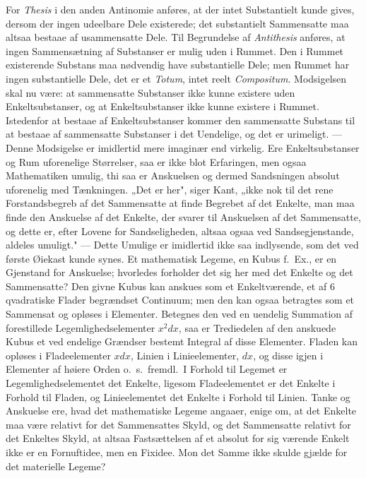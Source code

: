 \documentclass[12pt]{article}
\newcommand{\opage}[1]{\marginnote{\footnotesize\textit{[#1]}}}
\begin{document}
For \emph{Thesis} i den anden Antinomie anføres, at der intet
Substantielt kunde gives, dersom der ingen udeelbare Dele
existerede; det substantielt Sammensatte maa altsaa bestaae af
usammensatte Dele. Til Begrundelse af \emph{Antithesis} anføres, at
ingen Sammensætning af Substanser er mulig uden i Rummet.
Den i Rummet existerende Substans maa nødvendig have
substantielle Dele; men Rummet har ingen substantielle Dele, det
er et \emph{Totum}, intet reelt \emph{Compositum}. Modsigelsen skal nu
være: at sammensatte Substanser ikke kunne existere uden
Enkeltsubstanser, og at Enkeltsubstanser ikke kunne existere i
Rummet. Istedenfor at bestaae af Enkeltsubstanser kommer
den sammensatte Substans til at bestaae af sammensatte
Substanser i det Uendelige, og det er urimeligt. --- Denne
Modsigelse er imidlertid mere imaginær end virkelig. Ere Enkelt\-substanser
og Rum uforenelige Størrelser, saa er ikke blot
Erfaringen, men ogsaa Mathematiken umulig, thi saa er
Anskuelsen og dermed Sandsningen absolut uforenelig med Tænk\-ningen.
„Det er her", siger Kant, „ikke nok til det rene
Forstandsbegreb af det Sammensatte at finde Begrebet af det
Enkelte, man maa finde den Anskuelse af det Enkelte, der
svarer til Anskuelsen af det Sammensatte, og dette er, efter
Lovene for Sandseligheden, altsaa ogsaa ved Sandsegjenstande,
aldeles umuligt." --- Dette Umulige er imidlertid ikke saa
indlysende, som det ved første Øiekast kunde synes. Et
mathematisk Legeme, en Kubus f.\ Ex., er en Gjenstand for
Anskuelse; hvorledes forholder det sig her med det Enkelte og det
\opage{18} Sammensatte? Den givne Kubus kan anskues som et
Enkeltværende, et af 6 qvadratiske Flader begrændset Continuum;
men den kan ogsaa betragtes som et Sammensat og opløses i
Elementer. Betegnes den ved en uendelig Summation af
forestillede Legemlighedselementer $x^2dx$, saa er Trediedelen af den
anskuede Kubus et ved endelige Grændser bestemt Integral af
disse Elementer. Fladen kan opløses i Fladeelementer $xdx$,
Linien i Linieelementer, $dx$, og disse igjen i Elementer af
høiere Orden o.\ s.\ fremdl.\ I Forhold til Legemet er
Legemlighedselementet det Enkelte, ligesom Fladeelementet er det
Enkelte i Forhold til Fladen, og Linieelementet det Enkelte i
Forhold til Linien. Tanke og Anskuelse ere, hvad det
mathematiske Legeme angaaer, enige om, at det Enkelte maa være
relativt for det Sammensattes Skyld, og det Sammensatte
relativt for det Enkeltes Skyld, at altsaa Fastsættelsen af et absolut
for sig værende Enkelt ikke er en Fornuftidee, men en Fixidee.
Mon det Samme ikke skulde gjælde for det materielle Legeme?
\end{document}
